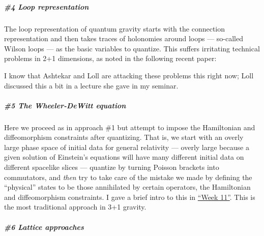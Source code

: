 \documentclass{article}
\def\tightlist{}
\renewcommand{\texttt}[1]{%
  \begingroup
  \ttfamily
  \begingroup\lccode`~=`/\lowercase{\endgroup\def~}{/\discretionary{}{}{}}%
  \begingroup\lccode`~=`[\lowercase{\endgroup\def~}{[\discretionary{}{}{}}%
  \begingroup\lccode`~=`.\lowercase{\endgroup\def~}{.\discretionary{}{}{}}%
  \catcode`/=\active\catcode`[=\active\catcode`.=\active
  \scantokens{#1\noexpand}%
  \endgroup
}
\begin{document}
\hypertarget{loop-representation}{%
\subparagraph{\#4 Loop representation}\label{loop-representation}}

The loop representation of quantum gravity starts with the connection
representation and then takes traces of holonomies around loops ---
so-called Wilson loops --- as the basic variables to quantize. This
suffers irritating technical problems in 2+1 dimensions, as noted in the
following recent paper:

\noindent
I know that Ashtekar and Loll are attacking these problems this right
now; Loll discussed this a bit in a lecture she gave in my seminar.

\hypertarget{the-wheeler-dewitt-equation}{%
\subparagraph{\#5 The Wheeler-DeWitt
equation}\label{the-wheeler-dewitt-equation}}

Here we proceed as in approach \#1 but attempt to impose the Hamiltonian
and diffeomorphism constraints after quantizing. That is, we start with
an overly large phase space of initial data for general relativity ---
overly large because a given solution of Einstein's equations will have
many different initial data on different spacelike slices --- quantize
by turning Poisson brackets into commutators, and \emph{then} try to take care
of the mistake we made by defining the ``physical'' states to be those
annihilated by certain operators, the Hamiltonian and diffeomorphism
constraints. I gave a brief intro to this in
\protect\hyperlink{week11}{``Week 11''}. This is the most traditional
approach in 3+1 gravity.

\hypertarget{lattice-approaches}{%
\subparagraph{\#6 Lattice approaches}\label{lattice-approaches}}
\end{document}
